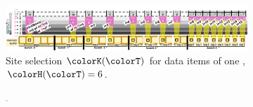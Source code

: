 \begin{figure}[htbp!]
  \flushleft
  \begin{subfigure}[b]{0.972\linewidth}
    \includegraphics[width=\textwidth, trim={0cm 0cm 0.3cm 1cm}, clip]{img/hsurf-steady-intuition}
    \vspace{-4ex}
    \caption{\footnotesize Site selection $\colorK(\colorT)$ for data items of one \hv{}, $\colorH(\colorT) = 6$.}
    \label{fig:hsurf-steady-intuition-diagram}
  \end{subfigure}
\vspace{-2ex}
  \flushright
  \begin{subfigure}[b]{0.98\linewidth}
    \includegraphics[width=0.011\textwidth, trim={0.2cm 2.8cm 31.8cm 2.8cm}, clip]{binder/teeplots/11/reservation-mode=steady+surface-size=32+viz=site-reservation-at-ranks-heatmap+ext=.pdf}%
\end{subfigure}
\end{figure}
